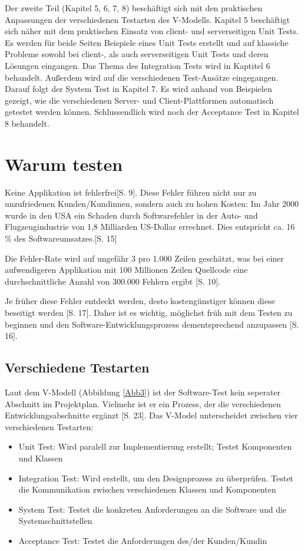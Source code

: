 \documentclass[a4paper,bibtotoc,oneside]{scrbook}
\begin{document}
Der zweite Teil (Kapitel 5, 6, 7, 8) beschäftigt sich mit den praktischen Anpassungen der verschiedenen Testarten des V-Modells. Kapitel 5 beschäftigt sich näher mit dem praktischen Einsatz von client- und serverseitigen Unit Tests. Es werden für beide Seiten Beispiele eines Unit Tests erstellt und auf klassiche Probleme sowohl bei client-, als auch serverseitigen Unit Tests und deren Lösungen eingangen. Das Thema des Integration Tests wird in Kaptitel 6 behandelt. Außerdem wird auf die verschiedenen Test-Ansätze eingegangen. Darauf folgt der System Test in Kapitel 7. Es wird anhand von Beispielen gezeigt, wie die verschiedenen Server- und Client-Plattformen automatisch getestet werden können. Schlussendlich wird noch der Acceptance Test in Kapitel 8 behandelt.

\chapter{Warum testen}
Keine Applikation ist fehlerfrei\cite{empiric_invest}[S. 9]. Diese Fehler  führen nicht nur zu unzufriedenen Kunden/Kundinnen, sondern auch zu hohen Kosten: \glqq Im Jahr 2000 wurde in den USA ein Schaden durch Softwarefehler in der Auto- und Flugzeugindustrie von 1,8 Milliarden US-Dollar errechnet. Dies entspricht ca. 16 \% des Softwareumsatzes.\grqq\cite{betrieb}[S. 15]

Die Fehler-Rate wird auf ungefähr 3 pro 1.000 Zeilen geschätzt, was bei einer aufwendigeren Applikation mit 100 Millionen Zeilen Quellcode eine durchschnittliche Anzahl von 300.000 Fehlern ergibt \cite{eval_regression}[S. 10].

Je früher diese Fehler entdeckt werden, desto kostengünstiger können diese beseitigt werden \cite{betrieb}[S. 17]. Daher ist es wichtig, möglichst früh mit dem Testen zu beginnen und den Software-Entwicklungsprozess dementsprechend anzupassen \cite{betrieb}[S. 16].

\section{Verschiedene Testarten}
Laut dem V-Modell (Abbildung \ref{Abb3}) ist der Software-Test kein seperater Abschnitt im Projektplan. Vielmehr ist er ein Prozess, der die verschiedenen Entwicklungsabschnitte ergänzt \cite{betrieb}[S. 23]. Das V-Model unterscheidet zwischen vier verschiedenen Testarten:

\begin{itemize}
	\item Unit Test: Wird paralell zur Implementierung erstellt; Testet Komponenten und Klassen
	\item Integration Test: Wird erstellt, um den Designprozess zu überprüfen. Testet die Kommunikation zwischen verschiedenen Klassen und Komponenten
	\item System Test: Testet die konkreten Anforderungen an die Software und die Systemschnittstellen
	\item Acceptance Test: Testet die Anforderungen des/der Kunden/Kundin
\end{itemize}
\end{document}
